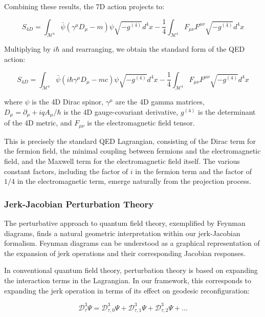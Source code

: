 \documentclass{article}
\begin{document}
Combining these results, the 7D action projects to:

\begin{equation}
S_{4D} = \int_{\mathcal{M}^4} \bar{\psi} (\gamma^\mu D_\mu - m) \psi \sqrt{-g^{(4)}} d^4x - \frac{1}{4} \int_{\mathcal{M}^4} F_{\mu\nu} F^{\mu\nu} \sqrt{-g^{(4)}} d^4x
\end{equation}

Multiplying by $i\hbar$ and rearranging, we obtain the standard form of the QED action:

\begin{equation}
S_{4D} = \int_{\mathcal{M}^4} \bar{\psi} (i\hbar \gamma^\mu D_\mu - mc) \psi \sqrt{-g^{(4)}} d^4x - \frac{1}{4} \int_{\mathcal{M}^4} F_{\mu\nu} F^{\mu\nu} \sqrt{-g^{(4)}} d^4x
\end{equation}

where $\psi$ is the 4D Dirac spinor, $\gamma^\mu$ are the 4D gamma matrices, $D_\mu = \partial_\mu + iq A_\mu / \hbar$ is the 4D gauge-covariant derivative, $g^{(4)}$ is the determinant of the 4D metric, and $F_{\mu\nu}$ is the electromagnetic field tensor.

This is precisely the standard QED Lagrangian, consisting of the Dirac term for the fermion field, the minimal coupling between fermions and the electromagnetic field, and the Maxwell term for the electromagnetic field itself. The various constant factors, including the factor of $i$ in the fermion term and the factor of $1/4$ in the electromagnetic term, emerge naturally from the projection process.

\subsubsection{Jerk-Jacobian Perturbation Theory}

The perturbative approach to quantum field theory, exemplified by Feynman diagrams, finds a natural geometric interpretation within our jerk-Jacobian formalism. Feynman diagrams can be understood as a graphical representation of the expansion of jerk operations and their corresponding Jacobian responses.

In conventional quantum field theory, perturbation theory is based on expanding the interaction terms in the Lagrangian. In our framework, this corresponds to expanding the jerk operation in terms of its effect on geodesic reconfiguration:

\begin{equation}
\mathcal{D}_\tau^3 \Psi = \mathcal{D}_{\tau, 0}^3 \Psi + \mathcal{D}_{\tau, 1}^3 \Psi + \mathcal{D}_{\tau, 2}^3 \Psi + \ldots
\end{equation}
\end{document}
